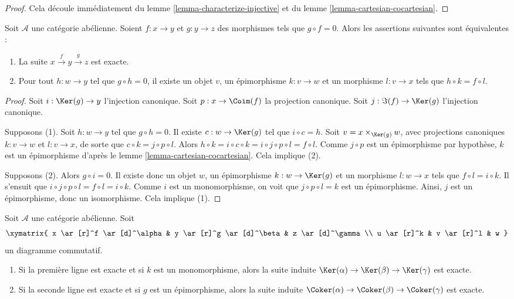 \begin{proof}
Cela découle immédiatement du lemme \ref{lemma-characterize-injective} et du
lemme \ref{lemma-cartesian-cocartesian}.
\end{proof}

\begin{lemma}
\label{lemma-check-exactness-fibre-product}
Soit $\mathcal{A}$ une catégorie abélienne. Soient $f:x\to y$ et $g:y\to z$ 
des morphismes tels que $g\circ f=0$. Alors les assertions suivantes sont équivalentes :
\begin{enumerate}
\item La suite $x\overset{f}\to y\overset{g}\to z$ est exacte.
\item Pour tout $h:w\to y$ tel que $g\circ h=0$, il existe un objet $v$, 
un épimorphisme $k:v\to w$ et un morphisme $l:v\to x$ tels que $h\circ k=f\circ l$.
\end{enumerate}
\end{lemma}

\begin{proof}
Soit $i:\Ker(g)\to y$ l'injection canonique. Soit 
$p:x\to\Coim(f)$ la projection canonique. Soit 
$j:\Im(f)\to\Ker(g)$ l'injection canonique.

\medskip\noindent
Supposons (1). Soit $h:w\to y$ tel que $g\circ h=0$. Il existe 
$c:w\to\Ker(g)$ tel que $i\circ c=h$. 
Soit $v=x\times_{\Ker(g)}w$, avec projections canoniques 
$k:v\to w$ et $l:v\to x$, de sorte que $c\circ k=j\circ p\circ l$. 
Alors $h\circ k=i\circ c\circ k=i\circ j\circ p\circ l=f\circ l$. 
Comme $j\circ p$ est un épimorphisme par hypothèse, $k$ est un 
épimorphisme d'après le lemme \ref{lemma-cartesian-cocartesian}. Cela implique (2).

\medskip\noindent
Supposons (2). Alors $g\circ i=0$. Il existe donc un objet 
$w$, un épimorphisme $k:w\to\Ker(g)$ et un morphisme 
$l:w\to x$ tels que $f\circ l=i\circ k$. Il s'ensuit que 
$i\circ j\circ p\circ l=f\circ l=i\circ k$. Comme $i$ est un 
monomorphisme, on voit que $j\circ p\circ l=k$ est un épimorphisme. 
Ainsi, $j$ est un épimorphisme, donc un isomorphisme. Cela implique (1).
\end{proof}

\begin{lemma}
\label{lemma-exact-kernel-sequence}
Soit $\mathcal{A}$ une catégorie abélienne. Soit
$$
\xymatrix{
x \ar[r]^f \ar[d]^\alpha &
y \ar[r]^g \ar[d]^\beta &
z \ar[d]^\gamma\\
u \ar[r]^k & v \ar[r]^l & w
}
$$
un diagramme commutatif.
\begin{enumerate}
\item Si la première ligne est exacte et si $k$ est un monomorphisme, alors la suite 
induite $\Ker(\alpha) \to \Ker(\beta) \to \Ker(\gamma)$ 
est exacte.
\item Si la seconde ligne est exacte et si $g$ est un épimorphisme, alors la suite 
induite
$\Coker(\alpha) \to \Coker(\beta) \to \Coker(\gamma)$ 
est exacte.
\end{enumerate}
\end{lemma}


